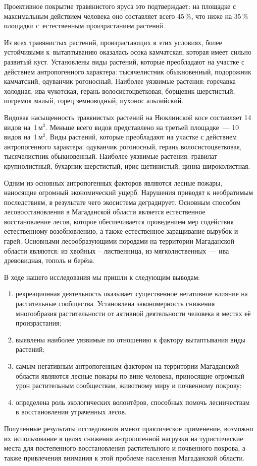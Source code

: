 Проективное покрытие травянистого яруса это подтверждает: на площадке с максимальным действием человека оно составляет всего 45\,\%, что ниже на 35\,\% площадки с~естественным произрастанием растений.

Из всех травянистых растений, произрастающих в этих условиях, более устойчивыми к~вытаптыванию оказалась осока камчатская, которая имеет сильно развитый куст. Установлены виды растений, которые преобладают на участке с действием антропогенного характера: тысячелистник обыкновенный, подорожник камчатский, одуванчик рогоносный. Наиболее уязвимые растения: горечавка холодная, ива чукотская, герань волосистоцветковая, борщевик шерстистый, погремок малый, горец земноводный, пухонос альпийский.

Видовая насыщенность травянистых растений на Нюклинской косе составляет 14 видов на~1\,м$^2$. Меньше всего видов представлено на третьей площадке~--- 10 видов на~1\,м$^2$. Виды растений, которые преобладают на участке с действием антропогенного характера: одуванчик рогоносный, герань волосистоцветковая, тысячелистник обыкновенный. Наиболее уязвимые растения: гравилат крупнолистный, бухарник шерстистый, ирис щетинистый, цинна широколистная.

Одним из основных антропогенных факторов являются лесные пожары, наносящие огромный экономический ущерб. Нарушения приводят к необратимым последствиям, в результате чего экосистема деградирует. Основным способом лесовосстановления в Магаданской области является естественное восстановление лесов, которое обеспечивается проведением мер содействия естественному возобновлению, а также естественное заращивание вырубок и гарей. Основными лесообразующими породами на территории Магаданской области являются: из хвойных – лиственница, из мягколиственных~--- ива древовидная, тополь и берёза.

В ходе нашего исследования мы пришли к следующим выводам:

\begin{enumerate}[noitemsep]\vspace{-8pt}
\item рекреационная деятельность оказывает существенное негативное влияние на растительные сообщества. Установлена закономерность снижения многообразия растительности от активной деятельности человека в местах её произрастания;
\item выявлены наиболее уязвимые по отношению к фактору вытаптывания виды растений;
\item самым негативным антропогенным фактором на территории Магаданской области являются лесные пожары по вине человека, приносящие огромный урон растительным сообществам, животному миру и почвенному покрову;
\item определена роль экологических волонтёров, способных помочь лесничествам в восстановлении утраченных лесов.
\end{enumerate}\vspace{-8pt}

Полученные результаты исследования имеют практическое применение, возможно их использование в целях снижения антропогенной нагрузки на туристические места для постепенного восстановления растительного и почвенного покрова, а также привлечения внимания к этой проблеме населения Магаданской области.\enlargethispage{\baselineskip}

